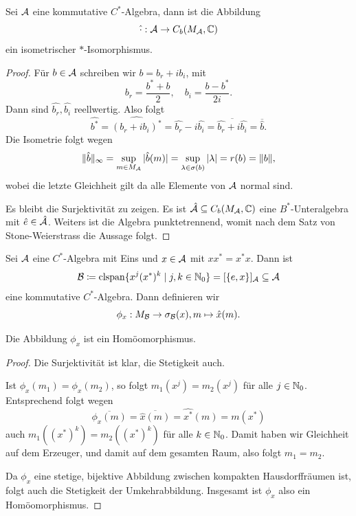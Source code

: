 \begin{lemma}
    Sei $\mathcal{A}$ eine kommutative $C^*$-Algebra, dann ist die Abbildung
    $$ \hat{\cdot} : \mathcal{A} \to C_b(M_{\mathcal{A}}, \mathbb{C}) $$
    ein isometrischer $\ast$-Isomorphismus.
\end{lemma}

\begin{proof}
    Für $b \in \mathcal{A}$ schreiben wir $b = b_r + i b_i$, mit
    $$ b_r = \frac{b^* + b}{2}, \quad b_i = \frac{b - b^*}{2i}. $$
    Dann sind $\hat{b_r}, \hat{b_i}$ reellwertig. Also folgt
    $$ \hat{b^*} = \widehat{(b_r + i b_i)^*} = \hat{b_r} - i \hat{b_i} = \overline{\hat{b_r} + i \hat{b_i}} = \overline{\hat{b}}. $$
    Die Isometrie folgt wegen
    $$ \Vert \hat{b} \Vert_\infty = \sup_{m \in M_{\mathcal{A}}} \vert \hat{b}(m) \vert = \sup_{\lambda \in \sigma(b)} \vert \lambda \vert = r(b) = \Vert b \Vert, $$
    wobei die letzte Gleichheit gilt da alle Elemente von $\mathcal{A}$ normal sind.

    Es bleibt die Surjektivität zu zeigen. Es ist $\hat{\mathcal{A}} \subseteq C_b(M_{\mathcal{A}}, \mathbb{C})$ eine $B^*$-Unteralgebra mit $\hat{e} \in \hat{\mathcal{A}}$. Weiters ist die Algebra punktetrennend, womit nach dem Satz von Stone-Weierstrass die Aussage folgt. %
\end{proof}

\begin{definition} \label{def:phi-x}
    Sei $\mathcal{A}$ eine $C^*$-Algebra mit Eins und $x \in \mathcal{A}$ mit $x x^* = x^* x$. Dann ist
    $$ \mathcal{B} \coloneqq \mathrm{clspan} \{ x^j (x^*)^k \mid j, k \in \mathbb{N}_0 \} = [\{ e, x \}]_{\mathcal{A}} \subseteq \mathcal{A} $$
    eine kommutative $C^*$-Algebra. Dann definieren wir
    $$ \phi_x : M_{\mathcal{B}} \to \sigma_{\mathcal{B}}(x), m \mapsto \hat{x}(m). $$
\end{definition}

\begin{lemma}
    Die Abbildung $\phi_x$ ist ein Homöomorphismus.
\end{lemma}

\begin{proof}
    Die Surjektivität ist klar, die Stetigkeit auch.

    Ist $\phi_x (m_1) = \phi_x (m_2)$, so folgt $m_1(x^j) = m_2(x^j)$ für alle $j \in \mathbb{N}_0$. Entsprechend folgt wegen
    $$ \overline{\phi_x(m)} = \overline{\hat{x}(m)} = \hat{x^*}(m) = m(x^*) $$
    auch $m_1((x^*)^k) = m_2((x^*)^k)$ für alle $k \in \mathbb{N}_0$. Damit haben wir Gleichheit auf dem Erzeuger, und damit auf dem gesamten Raum, also folgt $m_1 = m_2$.

    Da $\phi_x$ eine stetige, bijektive Abbildung zwischen kompakten Hausdorffräumen ist, folgt auch die Stetigkeit der Umkehrabbildung. Insgesamt ist $\phi_x$ also ein Homöomorphismus.
\end{proof}